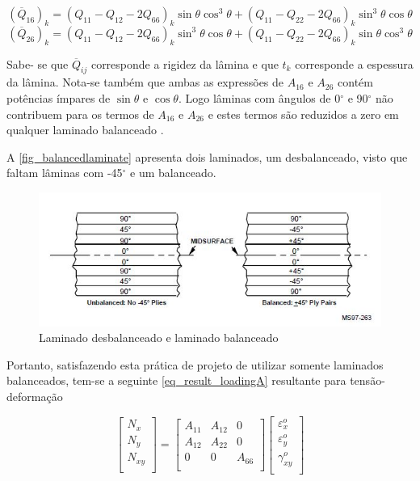 \begin{equation} \label{eq_Q16}
(\overline{Q}_{16})_k
=
({Q}_{11}-{Q}_{12}-2{Q}_{66})_k \sin\theta \cos^3\theta + ({Q}_{11}-{Q}_{22}-2{Q}_{66})_k \sin^3\theta \cos\theta
\end{equation}
\begin{equation} \label{eq_Q26}
(\overline{Q}_{26})_k
=
({Q}_{11}-{Q}_{12}-2{Q}_{66})_k \sin^3\theta \cos\theta + ({Q}_{11}-{Q}_{22}-2{Q}_{66})_k \sin\theta \cos^3\theta
\end{equation}

Sabe- se que $ \overline{Q}_{ij} $ corresponde a rigidez da lâmina e que $ t_k $ corresponde a espessura da lâmina. Nota-se também que ambas as expressões de $ A_{16} $ e $ A_{26} $ contém potências ímpares de $ \sin\theta $ e $ \cos\theta $. Logo lâminas com ângulos de 0$^{\circ}$ e 90$^{\circ}$ não contribuem para os termos de $ A_{16} $ e $ A_{26} $ e estes termos são reduzidos a zero em qualquer laminado balanceado \cite{nasa1997guidelines}.

A \autoref{fig_balancedlaminate} apresenta dois laminados, um desbalanceado, visto que faltam lâminas com -45$^{\circ}$ e um balanceado.

\begin{figure}[ht]
	\caption{\label{fig_balancedlaminate}Laminado desbalanceado e laminado balanceado}
  \centering
  \includegraphics[scale=1.0]{figura/BalancedLaminate}
\end{figure}

Portanto, satisfazendo esta prática de projeto de utilizar somente laminados balanceados, tem-se a seguinte \autoref{eq_result_loadingA} resultante para tensão-deformação

\begin{equation} \label{eq_result_loadingA}
\begin{bmatrix}
    N_{x} \\
    N_{y} \\
    N_{xy} \\
\end{bmatrix}
=
\begin{bmatrix}
    A_{11} & A_{12} & 0\\
    A_{12} & A_{22} & 0\\
    0 & 0 & A_{66}\\
\end{bmatrix}
\begin{bmatrix}
    \varepsilon_{x}^o \\
    \varepsilon_{y}^o \\
    \gamma_{xy}^o \\
\end{bmatrix}
\end{equation}

